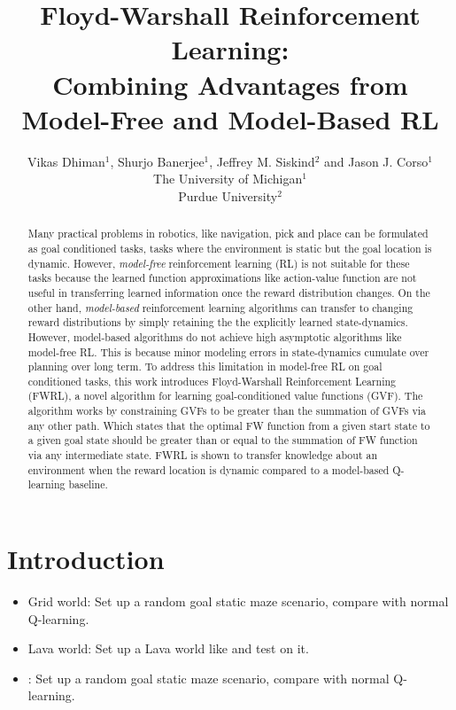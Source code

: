 \documentclass[letterpaper]{article} %
\title{Floyd-Warshall Reinforcement Learning: \\Combining Advantages from
Model-Free and Model-Based RL}
\author{Vikas Dhiman$^1$, Shurjo Banerjee$^1$, Jeffrey M. Siskind$^2$ and Jason J.
Corso$^1$\\
The University of Michigan$^1$\\
Purdue University$^2$}
\begin{document}
\maketitle
\begin{abstract}
Many practical problems in robotics, like navigation, pick and place can be
formulated as goal conditioned tasks, tasks where the environment is static but
the goal location is dynamic.
However, \emph{model-free} reinforcement learning (RL) is not suitable for these
tasks because the learned function approximations like action-value function are
not useful in transferring learned information once the reward distribution
changes.
On the other hand, \emph{model-based} reinforcement learning algorithms can
transfer to changing reward distributions by simply retaining the the
explicitly learned state-dynamics. However, model-based algorithms do not
achieve high asymptotic algorithms like model-free RL. This is because minor
modeling errors in state-dynamics cumulate over planning over long term.
To address this limitation in model-free RL on goal conditioned tasks, 
this work introduces Floyd-Warshall Reinforcement Learning (FWRL), a novel
algorithm for learning goal-conditioned value functions (GVF).
The algorithm works by constraining GVFs to be greater than the
summation of GVFs via any other path.  
Which states that the optimal FW function from a given start state to a
given goal state should be greater than or equal to the summation of FW
function via any intermediate state. 
FWRL is shown to transfer knowledge about an environment when the reward
location is dynamic compared to a model-based Q-learning baseline.
\end{abstract}


\section{ Introduction}



%













%



\begin{itemize}
    \item Grid world: Set up a random goal static maze scenario, compare with normal Q-learning.
    \item Lava world: Set up a Lava world like \cite{schaul2015universal} and test on it.
    \item {}: Set up a random goal static maze scenario, compare with normal Q-learning. 
\end{itemize}



\def\localbib{/home/dhiman/wrk/group-bib/shared}
\IfFileExists{\localbib.bib}{
}{
}

\end{document}

